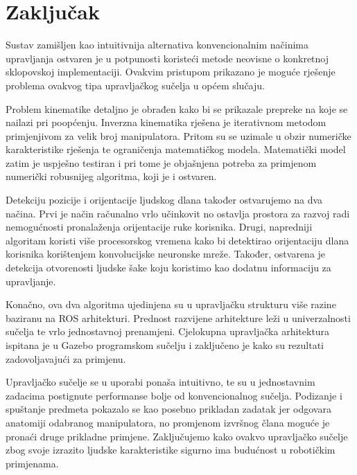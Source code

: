 \documentclass[times, utf8, diplomski, numeric]{fer}
\begin{document}
\chapter{Zaključak}
Sustav zamišljen kao intuitivnija alternativa konvencionalnim načinima upravljanja ostvaren je u potpunosti koristeći metode neovisne o konkretnoj sklopovskoj implementaciji. 
Ovakvim pristupom prikazano je moguće rješenje problema ovakvog tipa upravljačkog sučelja u općem slučaju.

Problem kinematike detaljno je obrađen kako bi se prikazale prepreke na koje se nailazi pri poopćenju.
Inverzna kinematika rješena je iterativnom metodom primjenjivom za velik broj manipulatora.
Pritom su se uzimale u obzir numeričke karakteristike rješenja te ograničenja matematičkog modela.
Matematički model zatim je uspješno testiran i pri tome je objašnjena potreba za primjenom numerički robusnijeg algoritma, koji je i ostvaren.

Detekciju pozicije i orijentacije ljudskog dlana također ostvarujemo na dva načina.
Prvi je način računalno vrlo učinkovit no ostavlja prostora za razvoj radi nemogućnosti pronalaženja orijentacije ruke korisnika.
Drugi, napredniji algoritam koristi više procesorskog vremena kako bi detektirao orijentaciju dlana korisnika korištenjem konvolucijske neuronske mreže.
Također, ostvarena je detekcija otvorenosti ljudske šake koju koristimo kao dodatnu informaciju za upravljanje.

Konačno, ova dva algoritma ujedinjena su u upravljačku strukturu više razine baziranu na ROS arhitekturi.
Prednost razvijene arhitekture leži u univerzalnosti sučelja te vrlo jednostavnoj prenamjeni.
Cjelokupna upravljačka arhitektura ispitana je u Gazebo programskom sučelju i zaključeno je kako su rezultati zadovoljavajući za primjenu.

Upravljačko sučelje se u uporabi ponaša intuitivno, te su u jednostavnim zadacima postignute performanse bolje od konvencionalnog sučelja.
Podizanje i spuštanje predmeta pokazalo se kao posebno prikladan zadatak jer odgovara anatomiji odabranog manipulatora, no promjenom izvršnog člana moguće je pronaći druge prikladne primjene.
Zaključujemo kako ovakvo upravljačko sučelje zbog svoje izrazito ljudske karakteristike sigurno ima budućnost u robotičkim primjenama.



\listoffigures
\listoftables
\clearpage
\appendix
\end{document}
